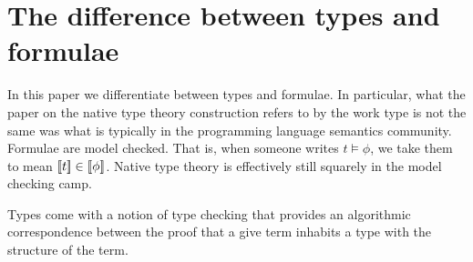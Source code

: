 \section{The difference between types and formulae}

In this paper we differentiate between types and formulae. In
particular, what the paper on the native type theory construction
refers to by the work type is not the same was what is typically in
the programming language semantics community. Formulae are model
checked. That is, when someone writes $t \models \phi$, we take them
to mean $[\![ t ]\!] \in [\![ \phi ]\!]$. Native type theory is
effectively still squarely in the model checking camp.

Types come with a notion of type checking that provides an algorithmic
correspondence between the proof that a give term inhabits a type with
the structure of the term.
